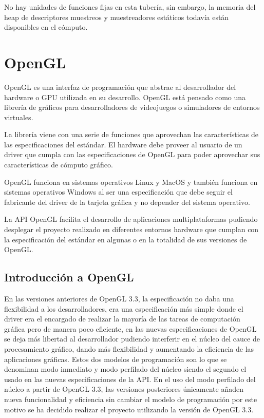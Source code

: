 \documentclass[a4paper, 17pt]{book}
\begin{document}
No hay unidades de funciones fijas en esta tubería, sin embargo, la memoria del heap de descriptores muestreos y muestreadores
estáticos todavía están disponibles en el cómputo.

\section{OpenGL} 
\label{sec:OpenGL}

OpenGL es una interfaz de programación que abstrae al desarrollador del hardware o GPU utilizada en su desarrollo.
OpenGL está pensado como una librería de gráficos para desarrolladores de videojuegos o simuladores de entornos virtuales. 

\vspace{1mm} %

La librería viene con una serie de funciones que aprovechan las características de las especificaciones del estándar.
El hardware debe proveer al usuario de un driver que cumpla con las especificaciones de OpenGL para poder aprovechar
sus características de cómputo gráfico. 

\vspace{1mm} %

OpenGL funciona en sistemas operativos Linux y MacOS y también funciona en sistemas operativos Windows al ser una
especificación que debe seguir el fabricante del driver de la tarjeta gráfica y no depender del sistema operativo.

\vspace{1mm} %

La API OpenGL facilita el desarrollo de aplicaciones multiplataformas pudiendo desplegar el proyecto realizado en
diferentes entornos hardware que cumplan con la especificación del estándar en algunas o en la totalidad de sus
versiones de OpenGL.

\subsection{Introducción a OpenGL} 
\label{subsec:IntroOpenGL}

En las versiones anteriores de OpenGL 3.3, la especificación no daba una flexibilidad a los desarrolladores, era una
especificación más simple donde el driver era el encargado de realizar la mayoría de las tareas de computación
gráfica pero de manera poco eficiente, en las nuevas especificaciones de OpenGL se deja más libertad al desarrollador
pudiendo interferir en el núcleo del cauce de procesamiento gráfico, dando más flexibilidad y aumentando la eficiencia
de las aplicaciones gráficas. Estos dos modelos de programación son lo que se denominan modo inmediato y modo perfilado
del núcleo siendo el segundo el usado en las nuevas especificaciones de la API. En el uso del modo perfilado del núcleo
a partir de OpenGL 3.3, las versiones posteriores únicamente añaden nueva funcionalidad y eficiencia sin cambiar el
modelo de programación por este motivo se ha decidido realizar el proyecto utilizando la versión de OpenGL 3.3.
\end{document}
